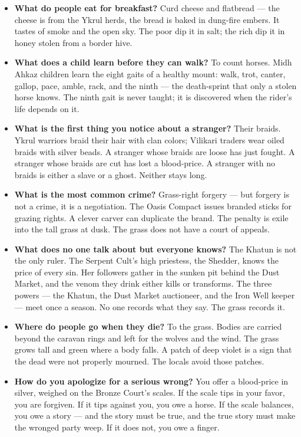 {{\begin{itemize}
\item \textbf{What do people eat for breakfast?} Curd cheese and flatbread --- the cheese is from the Ykrul herds, the bread is baked in dung-fire embers. It tastes of smoke and the open sky. The poor dip it in salt; the rich dip it in honey stolen from a border hive.
\item \textbf{What does a child learn before they can walk?} To count horses. Midh Ahkaz children learn the eight gaits of a healthy mount: walk, trot, canter, gallop, pace, amble, rack, and the ninth --- the death-sprint that only a stolen horse knows. The ninth gait is never taught; it is discovered when the rider's life depends on it.
\item \textbf{What is the first thing you notice about a stranger?} Their braids. Ykrul warriors braid their hair with clan colors; Vilikari traders wear oiled braids with silver beads. A stranger whose braids are loose has just fought. A stranger whose braids are cut has lost a blood-price. A stranger with no braids is either a slave or a ghost. Neither stays long.
\item \textbf{What is the most common crime?} Grass-right forgery --- but forgery is not a crime, it is a negotiation. The Oasis Compact issues branded sticks for grazing rights. A clever carver can duplicate the brand. The penalty is exile into the tall grass at dusk. The grass does not have a court of appeals.
\item \textbf{What does no one talk about but everyone knows?} The Khatun is not the only ruler. The Serpent Cult's high priestess, the Shedder, knows the price of every sin. Her followers gather in the sunken pit behind the Dust Market, and the venom they drink either kills or transforms. The three powers --- the Khatun, the Dust Market auctioneer, and the Iron Well keeper --- meet once a season. No one records what they say. The grass records it.
\item \textbf{Where do people go when they die?} To the grass. Bodies are carried beyond the caravan rings and left for the wolves and the wind. The grass grows tall and green where a body falls. A patch of deep violet is a sign that the dead were not properly mourned. The locals avoid those patches.
\item \textbf{How do you apologize for a serious wrong?} You offer a blood-price in silver, weighed on the Bronze Court's scales. If the scale tips in your favor, you are forgiven. If it tips against you, you owe a horse. If the scale balances, you owe a story --- and the story must be true, and the true story must make the wronged party weep. If it does not, you owe a finger.

\end{itemize}}}
